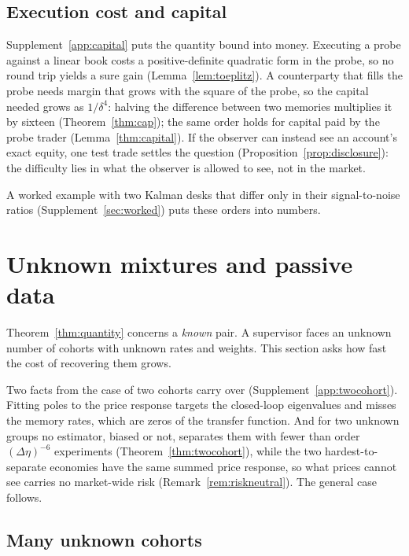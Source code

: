 \documentclass[12pt]{article}
\theoremstyle{definition}
\theoremstyle{remark}
\begin{document}
\subsection{Execution cost and capital}
Supplement~\ref{app:capital} puts the quantity bound into money. Executing a probe against a linear book costs a positive-definite quadratic form in the probe, so no round trip yields a sure gain (Lemma~\ref{lem:toeplitz}). A counterparty that fills the probe needs margin that grows with the square of the probe, so the capital needed grows as $1/\delta^4$: halving the difference between two memories multiplies it by sixteen (Theorem~\ref{thm:cap}); the same order holds for capital paid by the probe trader (Lemma~\ref{thm:capital}). If the observer can instead see an account's exact equity, one test trade settles the question (Proposition~\ref{prop:disclosure}): the difficulty lies in what the observer is allowed to see, not in the market.

A worked example with two Kalman desks that differ only in their signal-to-noise ratios (Supplement~\ref{sec:worked}) puts these orders into numbers.

\section{Unknown mixtures and passive data}\label{sec:mixtures}

Theorem~\ref{thm:quantity} concerns a \emph{known} pair. A supervisor faces an unknown number of cohorts with unknown rates and weights. This section asks how fast the cost of recovering them grows.

Two facts from the case of two cohorts carry over (Supplement~\ref{app:twocohort}). Fitting poles to the price response targets the closed-loop eigenvalues and misses the memory rates, which are zeros of the transfer function. And for two unknown groups no estimator, biased or not, separates them with fewer than order $(\Delta\eta)^{-6}$ experiments (Theorem~\ref{thm:twocohort}), while the two hardest-to-separate economies have the same summed price response, so what prices cannot see carries no market-wide risk (Remark~\ref{rem:riskneutral}). The general case follows.

\subsection{Many unknown cohorts}
\end{document}
